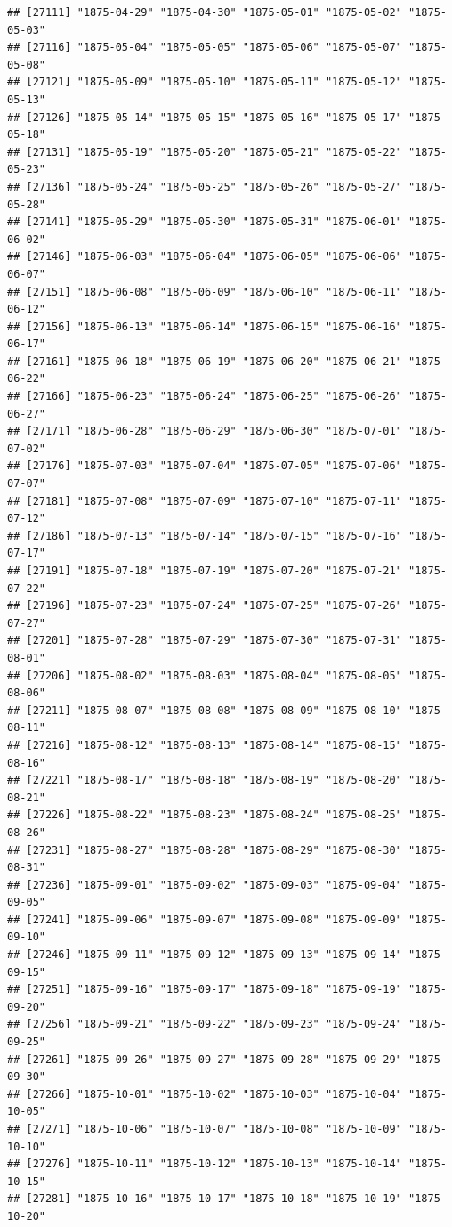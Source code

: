 \documentclass{article}\usepackage[]{graphicx}\usepackage[]{color}
\makeatletter
\newenvironment{kframe}{%
 \def\at@end@of@kframe{}%
 \ifinner\ifhmode%
  \def\at@end@of@kframe{\end{minipage}}%
  \begin{minipage}{\columnwidth}%
 \fi\fi%
 \def\FrameCommand##1{\hskip\@totalleftmargin \hskip-\fboxsep
 \colorbox{shadecolor}{##1}\hskip-\fboxsep
     \hskip-\linewidth \hskip-\@totalleftmargin \hskip\columnwidth}%
 \MakeFramed {\advance\hsize-\width
   \@totalleftmargin\z@ \linewidth\hsize
   \@setminipage}}%
 {\par\unskip\endMakeFramed%
 \at@end@of@kframe}
\newenvironment{knitrout}{}{} %
\makeatother
\begin{document}
\begin{description}
\begin{knitrout}
\begin{kframe}
\begin{verbatim}
## [27111] "1875-04-29" "1875-04-30" "1875-05-01" "1875-05-02" "1875-05-03"
## [27116] "1875-05-04" "1875-05-05" "1875-05-06" "1875-05-07" "1875-05-08"
## [27121] "1875-05-09" "1875-05-10" "1875-05-11" "1875-05-12" "1875-05-13"
## [27126] "1875-05-14" "1875-05-15" "1875-05-16" "1875-05-17" "1875-05-18"
## [27131] "1875-05-19" "1875-05-20" "1875-05-21" "1875-05-22" "1875-05-23"
## [27136] "1875-05-24" "1875-05-25" "1875-05-26" "1875-05-27" "1875-05-28"
## [27141] "1875-05-29" "1875-05-30" "1875-05-31" "1875-06-01" "1875-06-02"
## [27146] "1875-06-03" "1875-06-04" "1875-06-05" "1875-06-06" "1875-06-07"
## [27151] "1875-06-08" "1875-06-09" "1875-06-10" "1875-06-11" "1875-06-12"
## [27156] "1875-06-13" "1875-06-14" "1875-06-15" "1875-06-16" "1875-06-17"
## [27161] "1875-06-18" "1875-06-19" "1875-06-20" "1875-06-21" "1875-06-22"
## [27166] "1875-06-23" "1875-06-24" "1875-06-25" "1875-06-26" "1875-06-27"
## [27171] "1875-06-28" "1875-06-29" "1875-06-30" "1875-07-01" "1875-07-02"
## [27176] "1875-07-03" "1875-07-04" "1875-07-05" "1875-07-06" "1875-07-07"
## [27181] "1875-07-08" "1875-07-09" "1875-07-10" "1875-07-11" "1875-07-12"
## [27186] "1875-07-13" "1875-07-14" "1875-07-15" "1875-07-16" "1875-07-17"
## [27191] "1875-07-18" "1875-07-19" "1875-07-20" "1875-07-21" "1875-07-22"
## [27196] "1875-07-23" "1875-07-24" "1875-07-25" "1875-07-26" "1875-07-27"
## [27201] "1875-07-28" "1875-07-29" "1875-07-30" "1875-07-31" "1875-08-01"
## [27206] "1875-08-02" "1875-08-03" "1875-08-04" "1875-08-05" "1875-08-06"
## [27211] "1875-08-07" "1875-08-08" "1875-08-09" "1875-08-10" "1875-08-11"
## [27216] "1875-08-12" "1875-08-13" "1875-08-14" "1875-08-15" "1875-08-16"
## [27221] "1875-08-17" "1875-08-18" "1875-08-19" "1875-08-20" "1875-08-21"
## [27226] "1875-08-22" "1875-08-23" "1875-08-24" "1875-08-25" "1875-08-26"
## [27231] "1875-08-27" "1875-08-28" "1875-08-29" "1875-08-30" "1875-08-31"
## [27236] "1875-09-01" "1875-09-02" "1875-09-03" "1875-09-04" "1875-09-05"
## [27241] "1875-09-06" "1875-09-07" "1875-09-08" "1875-09-09" "1875-09-10"
## [27246] "1875-09-11" "1875-09-12" "1875-09-13" "1875-09-14" "1875-09-15"
## [27251] "1875-09-16" "1875-09-17" "1875-09-18" "1875-09-19" "1875-09-20"
## [27256] "1875-09-21" "1875-09-22" "1875-09-23" "1875-09-24" "1875-09-25"
## [27261] "1875-09-26" "1875-09-27" "1875-09-28" "1875-09-29" "1875-09-30"
## [27266] "1875-10-01" "1875-10-02" "1875-10-03" "1875-10-04" "1875-10-05"
## [27271] "1875-10-06" "1875-10-07" "1875-10-08" "1875-10-09" "1875-10-10"
## [27276] "1875-10-11" "1875-10-12" "1875-10-13" "1875-10-14" "1875-10-15"
## [27281] "1875-10-16" "1875-10-17" "1875-10-18" "1875-10-19" "1875-10-20"

\end{verbatim}
\end{kframe}
\end{knitrout}
\end{description}
\end{document}
